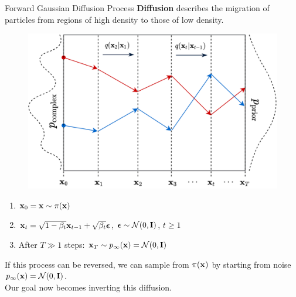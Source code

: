 \documentclass{beamer}
\begin{document}
\begin{frame}{Forward Gaussian Diffusion Process}
	\textbf{Diffusion} describes the migration of particles from regions of high density to those of low density.
	\vspace{-0.2cm}
	\begin{figure}
		\includegraphics[width=0.5\linewidth]{figs/diffusion_over_time}
	\end{figure}
    \eqpause
	\vspace{-0.5cm}
	\begin{enumerate}
		\item $\mathbf{x}_0 = \mathbf{x} \sim \pi(\mathbf{x})$
		\item $\mathbf{x}_t = \sqrt{1 - \beta_t} \mathbf{x}_{t-1} + \sqrt{\beta_t} \boldsymbol{\epsilon}$, $\boldsymbol{\epsilon} \sim \mathcal{N}(0, \mathbf{I})$, $t \geq 1$
		\item After $T \gg 1$ steps: $\mathbf{x}_T \sim p_\infty(\mathbf{x}) = \mathcal{N}(0, \mathbf{I})$
	\end{enumerate}
    \eqpause
	If this process can be reversed, we can sample from $\pi(\mathbf{x})$ by starting from noise $p_\infty(\mathbf{x}) = \mathcal{N}(0, \mathbf{I})$. \\
	Our goal now becomes inverting this diffusion.
\end{frame}
\end{document}
